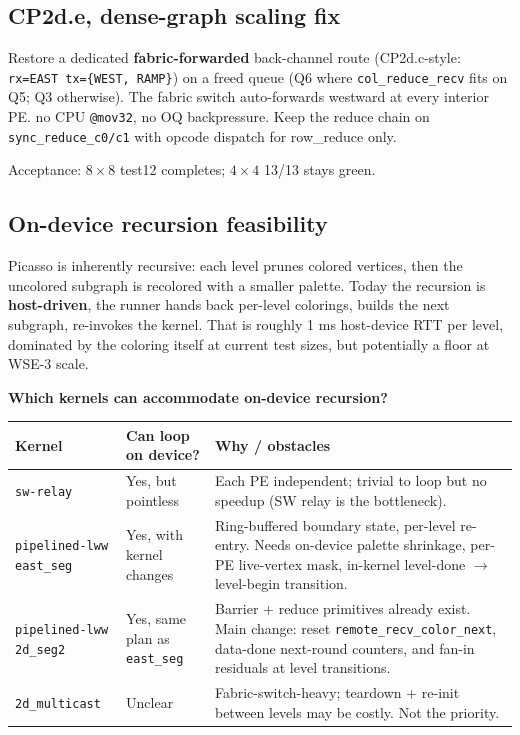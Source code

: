 \documentclass[11pt]{article}
\newcommand{\code}[1]{\texttt{#1}}
\begin{document}
\subsection{CP2d.e, dense-graph scaling fix}
\label{sec:cp2de}
Restore a dedicated \textbf{fabric-forwarded} back-channel route
(CP2d.c-style: \code{rx=EAST tx=\{WEST, RAMP\}}) on a freed queue
(Q6 where \code{col\_reduce\_recv} fits on Q5; Q3 otherwise). The
fabric switch auto-forwards westward at every interior PE.
no CPU \code{@mov32}, no OQ backpressure. Keep the reduce chain
on \code{sync\_reduce\_c0/c1} with opcode dispatch for row\_reduce
only.

Acceptance: $8\times 8$ test12 completes; $4\times 4$ 13/13 stays
green.

\subsection{On-device recursion feasibility}
Picasso is inherently recursive: each level prunes colored
vertices, then the uncolored subgraph is recolored with a smaller
palette. Today the recursion is \textbf{host-driven}, the
runner hands back per-level colorings, builds the next subgraph,
re-invokes the kernel. That is roughly 1 ms host-device RTT per
level, dominated by the coloring itself at current test sizes,
but potentially a floor at WSE-3 scale.

\textbf{Which kernels can accommodate on-device recursion?}

\begin{center}
\begin{tabular}{p{3.2cm} p{3.0cm} p{7.2cm}}
\toprule
Kernel & Can loop on device? & Why / obstacles \\
\midrule
\code{sw-relay} & Yes, but pointless & Each PE independent; trivial to loop but no speedup (SW relay is the bottleneck). \\
\code{pipelined-lww east\_seg} & Yes, with kernel changes & Ring-buffered boundary state, per-level re-entry. Needs on-device palette shrinkage, per-PE live-vertex mask, in-kernel level-done $\to$ level-begin transition. \\
\code{pipelined-lww 2d\_seg2} & Yes, same plan as \code{east\_seg} & Barrier + reduce primitives already exist. Main change: reset \code{remote\_recv\_color\_next}, data-done next-round counters, and fan-in residuals at level transitions. \\
\code{2d\_multicast} & Unclear & Fabric-switch-heavy; teardown + re-init between levels may be costly. Not the priority. \\
\bottomrule
\end{tabular}
\end{center}
\end{document}
